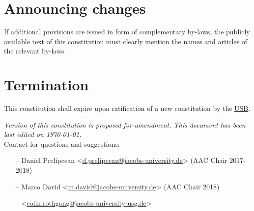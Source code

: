 \section{Announcing changes}
If additional provisions are issued in form of complementary by-laws, the publicly available text of this constitution must clearly mention the names and articles of the relevant by-laws.


\section{Termination}
This constitution shall expire upon ratification of a new constitution by the \hyperref[studentbody]{USB}.


\vfill
\nolinenumbers
\emph{Version  of this constitution is proposed for amendment. This document has been last edited on \today.}\\

Contact for questions and suggestions:
\begin{itemize}[nosep]
\item[--] Daniel Prelipcean <\url{d.prelipcean@jacobs-university.de}> (AAC Chair 2017-2018)
\item[--] Marco David <\url{m.david@jacobs-university.de}> (AAC Chair 2018)
\item[--] <\url{colin.rothgang@jacobs-university-usg.de}>
\end{itemize}